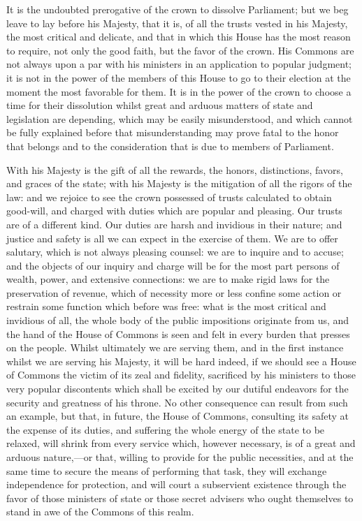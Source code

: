 It is the undoubted prerogative of the crown to dissolve Parliament; but we beg leave to lay before his Majesty, that it is, of all the trusts vested in his Majesty, the most critical and delicate, and that in which this House has the most reason to require, not only the good faith, but the favor of the crown. His Commons are not always upon a par with his ministers in an application to popular judgment; it is not in the power of the members of this House to go to their election at the moment the most favorable for them. It is in the power of the crown to choose a time for their dissolution whilst great and arduous matters of state and legislation are depending, which may be easily misunderstood, and which cannot be fully explained before that misunderstanding may prove fatal to the honor that belongs and to the consideration that is due to members of Parliament.

With his Majesty is the gift of all the rewards, the honors, distinctions, favors, and graces of the state; with his Majesty is the mitigation of all the rigors of the law: and we rejoice to see the crown possessed of trusts calculated to obtain good-will, and charged with duties which are popular and pleasing. Our trusts are of a different kind. Our duties are harsh and invidious in their nature; and justice and safety is all we can expect in the exercise of them. We are to offer salutary, which is not always pleasing counsel: we are to inquire and to accuse; and the objects of our inquiry and charge will be for the most part persons of wealth, power, and extensive connections: we are to make rigid laws for the preservation of revenue, which of necessity more or less confine some action or restrain some function which before was free: what is the most critical and invidious of all, the whole body of the public impositions originate from us, and the hand of the House of Commons is seen and felt in every burden that presses on the people. Whilst ultimately we are serving them, and in the first instance whilst we are serving his Majesty, it will be hard indeed, if we should see a House of Commons the victim of its zeal and fidelity, sacrificed by his ministers to those very popular discontents which shall be excited by our dutiful endeavors for the security and greatness of his throne. No other consequence can result from such an example, but that, in future, the House of Commons, consulting its safety at the expense of its duties, and suffering the whole energy of the state to be relaxed, will shrink from every service which, however necessary, is of a great and arduous nature,—or that, willing to provide for the public necessities, and at the same time to secure the means of performing that task, they will exchange independence for protection, and will court a subservient existence through the favor of those ministers of state or those secret advisers who ought themselves to stand in awe of the Commons of this realm.

